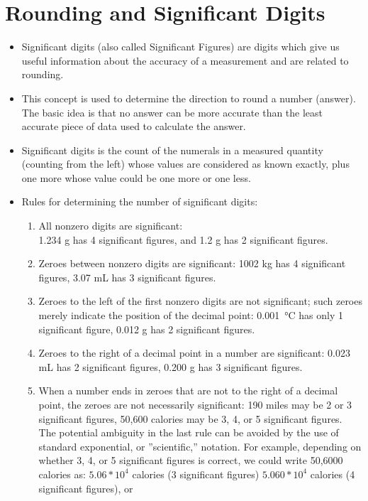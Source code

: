 \newpage

\section{Rounding and Significant Digits}

\begin{itemize}
\item Significant digits (also called Significant Figures) are digits which give us useful information about the accuracy of a measurement and are related to rounding.
\item This concept is used to determine the direction to round a number (answer). The basic idea is that no answer can be more accurate than the least accurate piece of data used to calculate the answer.\\
\item Significant digits is the count of the numerals in a measured quantity (counting from the left) whose values are considered as known exactly, plus one more whose value could be one more or one less.\\
\item Rules for determining the number of significant digits:
\begin{enumerate}
\item All nonzero digits are significant:\\
1.234 g has 4 significant figures, and 1.2 g has 2 significant figures.
\item Zeroes between nonzero digits are significant:
1002 kg has 4 significant figures, 3.07 mL has 3 significant figures.
\item Zeroes to the left of the first nonzero digits are not significant; such zeroes merely indicate the position of the decimal point:
\SI{0.001}{\celsius} has only 1 significant figure, 0.012 g has 2 significant figures.
\item Zeroes to the right of a decimal point in a number are significant:
0.023 mL has 2 significant figures, 0.200 g has 3 significant figures.
\item When a number ends in zeroes that are not to the right of a decimal point, the zeroes are not necessarily significant:
190 miles may be 2 or 3 significant figures, 50,600 calories may be 3, 4, or 5 significant figures. The potential ambiguity in the last rule can be avoided by the use of standard exponential, or ”scientific,” notation. For example, depending on whether 3, 4, or 5 significant figures is correct, we could write 50,6000 calories as: $5.06*10^4$ calories (3 significant figures) $5.060*10^4$ calories (4 significant figures), or

\end{enumerate}
\end{itemize}
